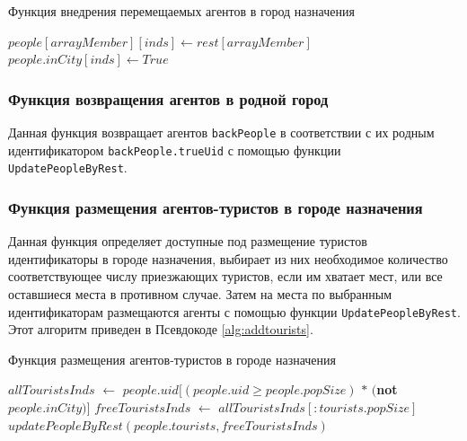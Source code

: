 \documentclass[a4paper,12pt]{article} %
\begin{document}
\begin{algorithm}[H]
\caption{Функция внедрения перемещаемых агентов в город назначения}
\label{alg:updatepeoplebyrest}
\begin{algorithmic}[1]
			\State \(people[arrayMember][inds] \gets rest[arrayMember]\)
		\EndIf
	\EndFor
	\State \(people.inCity[inds] \gets True\)
\EndFunction
\end{algorithmic}
\end{algorithm}

\subsubsection{Функция возвращения агентов в родной город}

Данная функция возвращает агентов \texttt{backPeople} в соответствии с их родным идентификатором \texttt{backPeople.trueUid} с помощью функции \texttt{UpdatePeopleByRest}. 


\subsubsection{Функция размещения агентов-туристов в городе назначения}

Данная функция определяет доступные под размещение туристов идентификаторы в городе назначения, выбирает из них необходимое количество соответствующее числу приезжающих туристов, если им хватает мест, или все оставшиеся места в противном случае. Затем на места по выбранным идентификаторам размещаются агенты с помощью функции \texttt{UpdatePeopleByRest}. Этот алгоритм приведен в Псевдокоде \ref{alg:addtourists}.

\begin{algorithm}[H]
\caption{Функция размещения агентов-туристов в городе назначения}
\label{alg:addtourists}
\begin{algorithmic}[1]
	\State \(allTouristsInds\) \(\gets\) \(people.uid[(people.uid \geqslant people.popSize)\) \(*\) \((\)\textbf{not} \(people.inCity)]\)
	\State \(freeTouristsInds\) \(\gets\) \(allTouristsInds[:tourists.popSize]\)
	\State \(updatePeopleByRest(people.tourists,freeTouristsInds)\)
\EndFunction
\end{algorithmic}
\end{algorithm}
\end{document}
